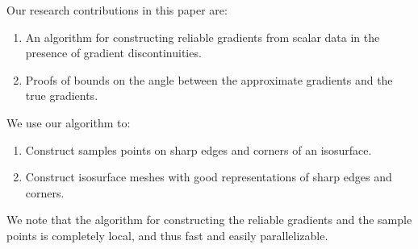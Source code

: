 Our research contributions in this paper are:
\begin{enumerate}
\itemsep0em 
\item An algorithm for constructing reliable gradients
from scalar data in the presence of gradient discontinuities.
\item Proofs of bounds on the angle between the approximate gradients
and the true gradients.
\end{enumerate}
We use our algorithm to:
\begin{enumerate}
\itemsep0em
\item Construct samples points on sharp edges and corners of an isosurface.
\item Construct isosurface meshes with good representations of sharp edges and corners.
\end{enumerate}

We note that the algorithm for constructing the reliable gradients and the sample points
is completely local, and thus fast and easily parallelizable.






